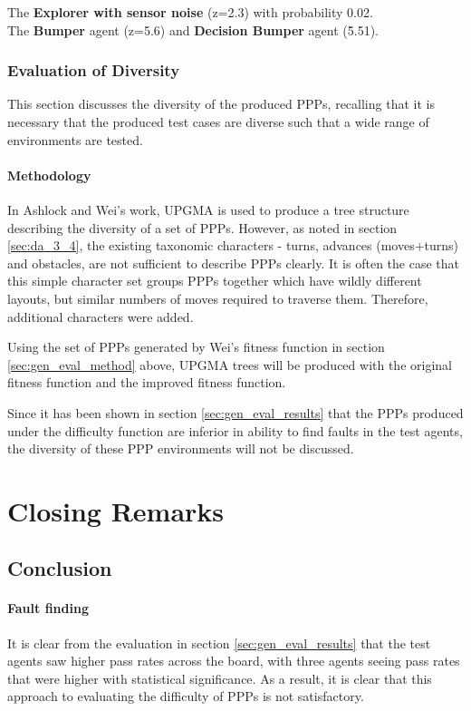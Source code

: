 \documentclass[authoryearcitations]{UoYCSproject}
\begin{document}
The \textbf{Explorer with sensor noise} (z=2.3) with probability 0.02.\\

The \textbf{Bumper} agent (z=5.6) and \textbf{Decision Bumper} agent (\=5.51).\\

\section{Evaluation of Diversity}
\label{sec:div_eval}
This section discusses the diversity of the produced PPPs, recalling that it is necessary that the produced test cases are diverse such that a wide range of environments are tested.

\subsection{Methodology}
\label{sec:div_eval_method}
In Ashlock and Wei's work, UPGMA is used to produce a tree structure describing the diversity of a set of PPPs. However, as noted in section \ref{sec:da_3_4}, the existing taxonomic characters - turns, advances (moves+turns) and obstacles, are not sufficient to describe PPPs clearly. It is often the case that this simple character set groups PPPs together which have wildly different layouts, but similar numbers of moves required to traverse them. Therefore, additional characters were added.

Using the set of PPPs generated by Wei's fitness function in section \ref{sec:gen_eval_method} above, UPGMA trees will be produced with the original fitness function and the improved fitness function.

Since it has been shown in section \ref{sec:gen_eval_results} that the PPPs produced under the difficulty function are inferior in ability to find faults in the test agents, the diversity of these PPP environments will not be discussed.


\part{Closing Remarks}
\label{sec:close}
\chapter{Conclusion}
\label{cha:conclusion}
\subsection{Fault finding}
\label{sec:conc_fault}
It is clear from the evaluation in section \ref{sec:gen_eval_results} that the test agents saw higher pass rates across the board, with three agents seeing pass rates that were higher with statistical significance. As a result, it is clear that this approach to evaluating the difficulty of PPPs is not satisfactory.
\end{document}

